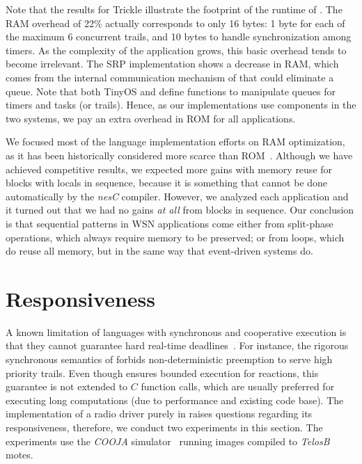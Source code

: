 Note that the results for Trickle illustrate the footprint of the runtime of 
\CEU.
The RAM overhead of 22\% actually corresponds to only 16 bytes: 1 byte for each 
of the maximum 6 concurrent trails, and 10 bytes to handle synchronization 
among timers.
%
As the complexity of the application grows, this basic overhead tends to become 
irrelevant.
%
The SRP implementation shows a decrease in RAM, which comes from the internal 
communication mechanism of \CEU that could eliminate a queue.
%
Note that both TinyOS and \CEU define functions to manipulate queues for timers 
and tasks (or trails).
Hence, as our implementations use components in the two systems, we pay an 
extra overhead in ROM for all applications.

We focused most of the language implementation efforts on RAM optimization, as 
it has been historically considered more scarce than ROM~\cite{wsn.decade}.
Although we have achieved competitive results, we expected more gains with 
memory reuse for blocks with locals in sequence, because it is something that 
cannot be done automatically by the \emph{nesC} compiler.
However, we analyzed each application and it turned out that we had no gains 
\emph{at all} from blocks in sequence.
Our conclusion is that sequential patterns in WSN applications come either from 
split-phase operations, which always require memory to be preserved;
or from loops, which do reuse all memory, but in the same way that event-driven 
systems do.

\section{Responsiveness}
\label{sec.eval.radio}

A known limitation of languages with synchronous and cooperative execution is 
that they cannot guarantee hard real-time 
deadlines~\cite{wsn.comparison,wsn.tosthreads}.
%
For instance, the rigorous synchronous semantics of \CEU forbids 
non-deterministic preemption to serve high priority trails.
%
Even though \CEU ensures bounded execution for reactions, this guarantee is not 
extended to $C$ function calls, which are usually preferred for executing long 
computations (due to performance and existing code base).
%
%
The implementation of a radio driver purely in \CEU raises questions
regarding its responsiveness, therefore, we conduct two experiments in this 
section.
%
The experiments use the \emph{COOJA} simulator~\cite{wsn.cooja} running images 
compiled to \emph{TelosB} motes.

